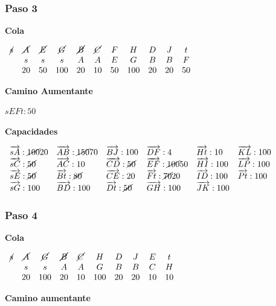 \documentclass[10pt,a4paper]{article}
\begin{document}
\subsubsection*{Paso 3}

\textbf{Cola}

\textbf{$\begin{array}{ccccccccccc} \cancel{s} & \cancel{A} & \cancel{E} & \cancel{G} & \cancel{B} & \cancel{C} & F & H & D &J& t\\ & s & s & s & A & A & E &G & B & B & F\\ & 20 & 50 & 100 & 20 & 10 & 50& 100 & 20 & 20 & 50 \end{array}$}

\textbf{Camino Aumentante}

\textbf{$sEFt:50$}

\textbf{Capacidades}

$\begin{array}{llllll} \overrightarrow{sA}: \cancel{100}20& \overrightarrow{AB}: \cancel{150} 70&\overrightarrow{BJ}: 100&\overrightarrow{DF}: 4&\overrightarrow{Ht}: 10&\overrightarrow{KL}: 100\\ \overrightarrow{sC}: \cancel{50}& \overrightarrow{AC}: 10&\overrightarrow{CD}: \cancel{50}&\overrightarrow{EF}: \cancel{100}50&\overrightarrow{HI}: 100&\overrightarrow{LP}: 100\\ \overrightarrow{sE}: \cancel{50}& \overrightarrow{Bt}: \cancel{80}&\overrightarrow{CE}: 20&\overrightarrow{Ft}: \cancel{70}20&\overrightarrow{ID}: 100&\overrightarrow{Pt}: 100\\ \overrightarrow{sG}: 100& \overrightarrow{BD}: 100&\overrightarrow{Dt}: \cancel{50}&\overrightarrow{GH}: 100&\overrightarrow{JK}: 100&\\ \end{array}$

\subsubsection*{Paso 4}

\textbf{Cola}

$\begin{array}{cccccccccc} \cancel{s} & \cancel{A} & \cancel{G} & \cancel{B} & \cancel{C} & H &D &J & E & t\\ & s & s & A & A &G & B &B & C &H\\ & 20 & 100 & 20 & 10 &100 &20 &20 & 10 & 10 \end{array}$

\textbf{Camino aumentante}
\end{document}
